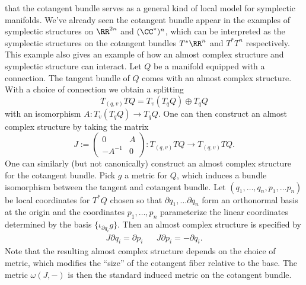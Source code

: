  that the cotangent bundle serves as a general kind of local model for symplectic manifolds. 
We've already seen the cotangent bundle appear in the examples of symplectic structures on $\RR^{2n}$ and $(\CC^*)^n$, which can be interpreted as the symplectic structures on the cotangent bundles $T^*\RR^n$ and $T^*T^n$ respectively. 
This example also gives an example of how an almost complex structure and symplectic structure can interact.
    Let $Q$ be a manifold equipped with a connection.
    The tangent bundle of $Q$ comes with an almost complex structure.
    With a choice of connection we obtain a splitting
    \[T_{(q,v)}TQ= T_v (T_q Q)\oplus T_q Q\]
    with an isomorphism $A: T_v(T_q Q)\to T_qQ.$
    One can then construct an almost complex structure by taking the matrix 
    \[J:=\begin{pmatrix} 0 & A\\ -A^{-1} & 0\end{pmatrix}: T_{(q,v)}TQ\to T_{(q,v)}TQ.\]
    One can similarly (but not canonically) construct an almost complex structure for the cotangent bundle. 
    Pick $g$ a metric for $Q$, which induces a bundle isomorphism between the tangent and cotangent bundle. 
    Let $(q_1, \ldots, q_n, p_1, \ldots p_n)$ be local coordinates for $T^*Q$ chosen so that $\partial q_1, \ldots \partial q_n$ form an orthonormal basis at the origin and the coordinates $p_1, \ldots, p_n$ parameterize the linear coordinates determined by the basis $\{\iota_{\partial q_i}g\}$.
    Then an almost complex structure is specified by 
    \begin{align*}
        J \partial q_i=\partial p_i && J\partial p_i = -\partial q_i.
    \end{align*}
    Note that the resulting almost complex structure depends on the choice of metric, which modifies the ``size'' of the cotangent fiber relative to the base. 
    The metric $\omega(J, -)$ is then the standard induced metric on the cotangent bundle.